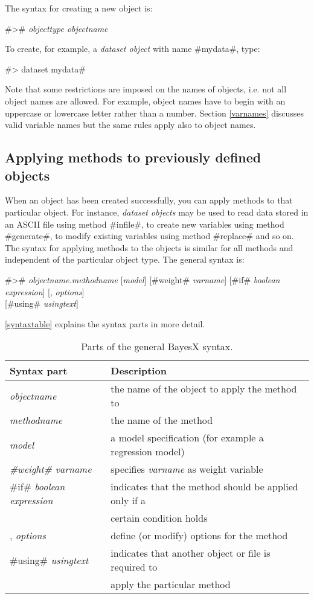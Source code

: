The syntax for creating a new object is:

#># {\em objecttype objectname}

To create, for example, a {\em dataset object} with name #mydata#, type:

#> dataset mydata#

Note that some restrictions are imposed on the names of objects, i.e. not all object names are allowed. For example, object names have to begin with an uppercase or lowercase letter rather than a number. Section \ref{varnames} discusses valid variable names but the same rules apply also to object names.

\subsection{Applying methods to previously defined objects}

When an object has been created successfully, you can apply methods to that particular object. For instance, {\em dataset objects} may be used to read data stored in an ASCII file using method #infile#, to create new variables using method #generate#, to modify existing variables using method #replace# and so on. The syntax for applying methods to the objects is similar for all methods and independent of the particular object type. The general syntax is: 

#># {\em objectname.methodname} [{\em model}] [#weight# {\em varname}] [#if# {\em boolean expression}] [, {\em options}] \\
\hspace*{4.8cm} [#using# {\em usingtext}]

\autoref{syntaxtable} explains the syntax parts in more detail.

\begin{table}[ht]
 \centering
 \begin{tabular}{|l|l|}
 \hline
 Syntax part & Description \\
 \hline
 {\em objectname} & the name of the object to apply the method to \\
 {\em methodname} & the name of the method \\
 {\em model} & a model specification (for example a regression model) \\
 {\em #weight# varname} & specifies {\em varname} as weight variable \\
 #if# {\em boolean expression} & indicates that the method should be applied only if a \\
 & certain condition holds \\
 , {\em options} & define (or modify) options for the method \\
 #using# {\em usingtext} & indicates that another object or file is required to \\
 & apply the particular method \\
 \hline
 \end{tabular}
 {\em \caption{\label{syntaxtable}Parts of the general BayesX syntax.}}
\end{table}

